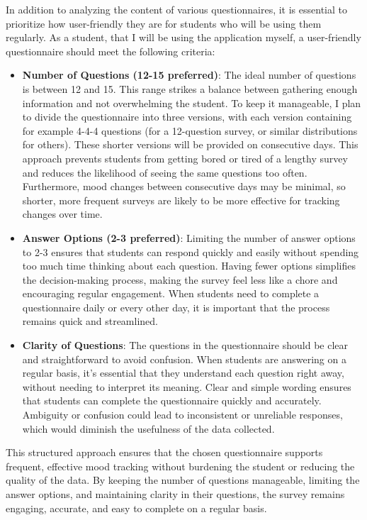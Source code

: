 In addition to analyzing the content of various questionnaires, it is essential to prioritize how user-friendly they are for students who will be using them regularly. As a student, that I will be using the application myself, a user-friendly questionnaire should meet the following criteria:
\begin{itemize}
    \item \textbf{Number of Questions (12-15 preferred)}: The ideal number of questions is between 12 and 15. This range strikes a balance between gathering enough information and not overwhelming the student. To keep it manageable, I plan to divide the questionnaire into three versions, with each version containing for example 4-4-4 questions (for a 12-question survey, or similar distributions for others). These shorter versions will be provided on consecutive days. This approach prevents students from getting bored or tired of a lengthy survey and reduces the likelihood of seeing the same questions too often. Furthermore, mood changes between consecutive days may be minimal, so shorter, more frequent surveys are likely to be more effective for tracking changes over time.
    \item \textbf{Answer Options (2-3 preferred)}: Limiting the number of answer options to 2-3 ensures that students can respond quickly and easily without spending too much time thinking about each question. Having fewer options simplifies the decision-making process, making the survey feel less like a chore and encouraging regular engagement. When students need to complete a questionnaire daily or every other day, it is important that the process remains quick and streamlined.
    \item \textbf{Clarity of Questions}: The questions in the questionnaire should be clear and straightforward to avoid confusion. When students are answering on a regular basis, it’s essential that they understand each question right away, without needing to interpret its meaning. Clear and simple wording ensures that students can complete the questionnaire quickly and accurately. Ambiguity or confusion could lead to inconsistent or unreliable responses, which would diminish the usefulness of the data collected.
\end{itemize}

\noindent This structured approach ensures that the chosen questionnaire supports frequent, effective mood tracking without burdening the student or reducing the quality of the data. By keeping the number of questions manageable, limiting the answer options, and maintaining clarity in their questions, the survey remains engaging, accurate, and easy to complete on a regular basis.\vspace{5mm}

